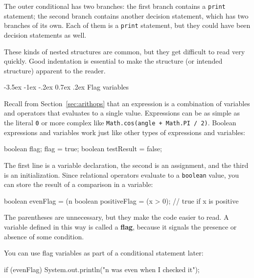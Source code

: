 \documentclass[12pt]{book}
\makeatletter
\renewcommand{\section}{\@startsection {section}{1}{\z@}%
    {-3.5ex \@plus -1ex \@minus -.2ex}%
    {0.7ex \@plus.2ex}%
    {\normalfont\Large\bfseries}}
\theoremstyle{exercise}
\newcommand{\java}[1]{\lstinline{#1}} %
\makeatother
\begin{document}
The outer conditional has two branches:
the first branch contains a \java{print} statement; the second branch contains another decision statement, which has two branches of its own.
Each of them is a \java{print} statement, but they could have been decision statements as well.

These kinds of nested structures are common, but they get difficult to read very quickly.
Good indentation is essential to make the structure (or intended structure) apparent to the reader.


\section{Flag variables}


Recall from Section~\ref{sec:arithops} that an expression is a combination of variables and operators that evaluates to a single value.
Expressions can be as simple as the literal \java{0} or more complex like \java{Math.cos(angle + Math.PI / 2)}.
Boolean expressions and variables work just like other types of expressions and variables:

\begin{code}
    boolean flag;
    flag = true;
    boolean testResult = false;
\end{code}


The first line is a variable declaration, the second is an assignment, and the third is an initialization.
Since relational operators evaluate to a \java{boolean} value, you can store the result of a comparison in a variable:

\begin{code}
    boolean evenFlag = (n %
    boolean positiveFlag = (x > 0);     // true if x is positive
\end{code}

The parentheses are unnecessary, but they make the code easier to read.
A variable defined in this way is called a {\bf flag}, because it signals the presence or absence of some condition.

You can use flag variables as part of a conditional statement later:

\begin{code}
    if (evenFlag) {
        System.out.println("n was even when I checked it");
    }
\end{code}
\end{document}
